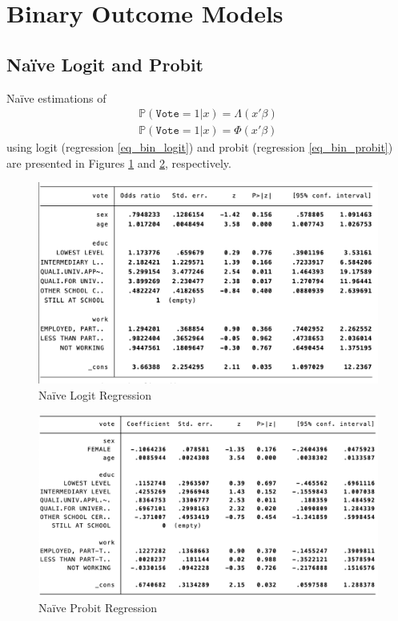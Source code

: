 \section{Binary Outcome Models}

    \subsection{Naïve Logit and Probit}
        Naïve estimations of 
        \begin{align}
            \mathbb{P}(\texttt{Vote} = 1 \vert x) = \Lambda(x'\beta) 
            \label{eq_bin_logit}
            \\
            \mathbb{P}(\texttt{Vote} = 1 \vert x) = \Phi(x'\beta) 
            \label{eq_bin_probit}
        \end{align}
        using logit (regression \ref{eq_bin_logit}) and probit (regression \ref{eq_bin_probit}) are presented in Figures \ref{fig_11_log} and \ref{fig_11_prob}, respectively.
            \begin{figure}[!htb]
                \centering \includegraphics[width=13cm]{figs/11_log.png}
                \caption{Naïve Logit Regression}
                \label{fig_11_log}
            \end{figure}
            \begin{figure}[!htb]
                \centering \includegraphics[width=13cm]{figs/11_prob.png}
                \caption{Naïve Probit Regression}
                \label{fig_11_prob}
            \end{figure}
